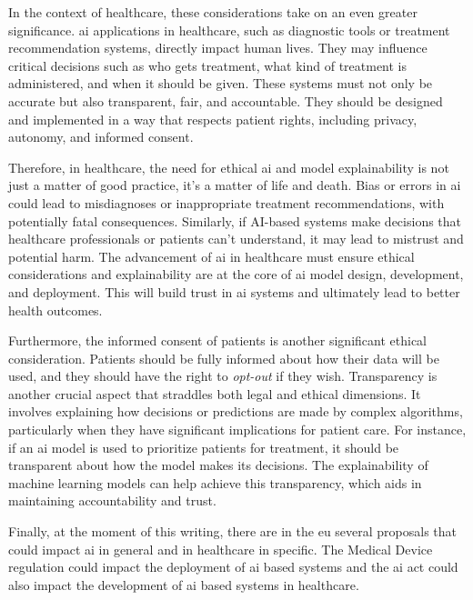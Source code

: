 In the context of healthcare, these considerations take on an even greater significance. \ac{ai} applications in healthcare, such as diagnostic tools or treatment recommendation systems, directly impact human lives. They may influence critical decisions such as who gets treatment, what kind of treatment is administered, and when it should be given. These systems must not only be accurate but also transparent, fair, and accountable. They should be designed and implemented in a way that respects patient rights, including privacy, autonomy, and informed consent.

Therefore, in healthcare, the need for ethical \ac{ai} and model explainability is not just a matter of good practice, it's a matter of life and death. Bias or errors in \ac{ai} could lead to misdiagnoses or inappropriate treatment recommendations, with potentially fatal consequences. Similarly, if AI-based systems make decisions that healthcare professionals or patients can't understand, it may lead to mistrust and potential harm. The advancement of \ac{ai} in healthcare must ensure ethical considerations and explainability are at the core of \ac{ai} model design, development, and deployment. This will build trust in \ac{ai} systems and ultimately lead to better health outcomes.

Furthermore, the informed consent of patients is another significant ethical consideration. Patients should be fully informed about how their data will be used, and they should have the right to \textit{opt-out} if they wish.
Transparency is another crucial aspect that straddles both legal and ethical dimensions. It involves explaining how decisions or predictions are made by complex algorithms, particularly when they have significant implications for patient care. For instance, if an \ac{ai} model is used to prioritize patients for treatment, it should be transparent about how the model makes its decisions. The explainability of machine learning models can help achieve this transparency, which aids in maintaining accountability and trust.

Finally, at the moment of this writing, there are in the \ac{eu} several proposals that could impact \ac{ai} in general and in healthcare in specific.
The Medical Device regulation could impact the deployment of \ac{ai} based systems and the \ac{ai} act could also impact the development of \ac{ai} based systems in healthcare.
